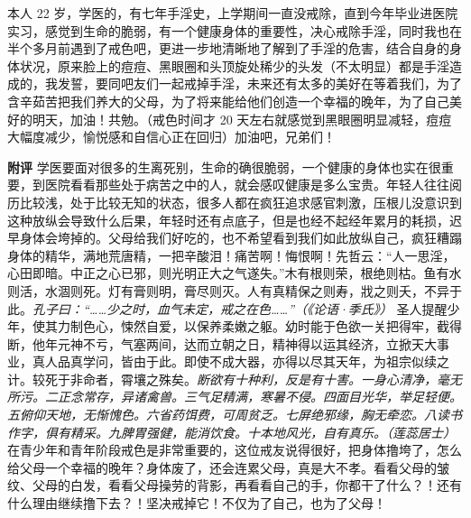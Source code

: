 \begin{case}
    本人 22 岁，学医的，有七年手淫史，上学期间一直没戒除，直到今年毕业进医院实习，感觉到生命的脆弱，有一个健康身体的重要性，决心戒除手淫，同时我也在半个多月前遇到了戒色吧，更进一步地清晰地了解到了手淫的危害，结合自身的身体状况，原来脸上的痘痘、黑眼圈和头顶旋处稀少的头发（不太明显）都是手淫造成的，我发誓，要同吧友们一起戒掉手淫，未来还有太多的美好在等着我们，为了含辛茹苦把我们养大的父母，为了将来能给他们创造一个幸福的晚年，为了自己美好的明天，加油！共勉。（戒色时间才 20 天左右就感觉到黑眼圈明显减轻，痘痘大幅度减少，愉悦感和自信心正在回归）加油吧，兄弟们！

    \textbf{附评} 学医要面对很多的生离死别，生命的确很脆弱，一个健康的身体也实在很重要，到医院看看那些处于病苦之中的人，就会感叹健康是多么宝贵。年轻人往往阅历比较浅，处于比较无知的状态，很多人都在疯狂追求感官刺激，压根儿没意识到这种放纵会导致什么后果，年轻时还有点底子，但是也经不起经年累月的耗损，迟早身体会垮掉的。父母给我们好吃的，也不希望看到我们如此放纵自己，疯狂糟蹋身体的精华，满地荒唐精，一把辛酸泪！痛苦啊！悔恨啊！先哲云：“人一思淫，心田即暗。中正之心已邪，则光明正大之气遂失。”木有根则荣，根绝则枯。鱼有水则活，水涸则死。灯有膏则明，膏尽则灭。人有真精保之则寿，戕之则夭，不异于此。\textit{孔子曰：“……少之时，血气未定，戒之在色……”（《论语·季氏》）} 圣人提醒少年，使其力制色心，悚然自爱，以保养柔嫩之躯。幼时能于色欲一关把得牢，截得断，他年元神不亏，气塞两间，达而立朝之日，精神得以运其经济，立掀天大事业，真人品真学问，皆由于此。即使不成大器，亦得以尽其天年，为祖宗似续之计。较死于非命者，霄壤之殊矣。\textit{断欲有十种利，反是有十害。一身心清净，毫无所污。二正念常存，异诸禽兽。三气足精满，寒暑不侵。四面目光华，举足轻便。五俯仰天地，无惭愧色。六省药饵费，可周贫乏。七屏绝邪缘，胸无牵恋。八读书作字，俱有精采。九脾胃强健，能消饮食。十本地风光，自有真乐。（莲蕊居士）} 在青少年和青年阶段戒色是非常重要的，这位戒友说得很好，把身体撸垮了，怎么给父母一个幸福的晚年？身体废了，还会连累父母，真是大不孝。看看父母的皱纹、父母的白发，看看父母操劳的背影，再看看自己的手，你都干了什么？！还有什么理由继续撸下去？！坚决戒掉它！不仅为了自己，也为了父母！
\end{case}


